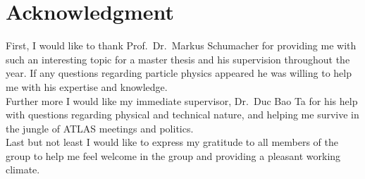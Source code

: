 \thispagestyle{plain}
\section*{Acknowledgment}
\vspace{2cm}

First, I would like to thank Prof.\ Dr.\ Markus Schumacher for providing me with such an interesting topic
for a master thesis and his supervision throughout the year.
If any questions regarding particle physics appeared he was willing to help me with his expertise and knowledge.\\[0.5cm]

Further more I would like my immediate supervisor, Dr.\ Duc Bao Ta for his help with questions regarding physical and technical nature,
and helping me survive in the jungle of ATLAS meetings and politics. \\[0.5cm]

Last but not least I would like to express my gratitude to all members of the group to help me feel welcome in the group
and providing a pleasant working climate.
